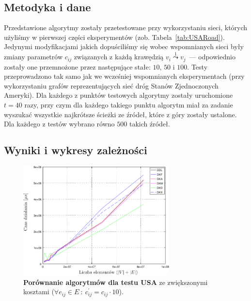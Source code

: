 \subsection{Metodyka i dane}



Przedstawione algorytmy zostały przetestowane przy wykorzystaniu sieci, których użyliśmy w pierwszej części eksperymentów (zob. Tabela~\ref{tab:USARoad}).
Jedynymi modyfikacjami jakich dopuściliśmy się wobec wspomnianych sieci były zmiany parametrów $c_{ij}$ związanych z każdą krawędzią $v_{i} \overset{1} \leadsto v_{j}$~--- odpowiednio zostały one przemnożone przez następujące stałe: $10$, $50$ i $100$.
Testy przeprowadzono tak samo jak we wcześniej wspomnianych eksperymentach (przy wykorzystaniu grafów reprezentujących sieć dróg Stanów Zjednoczonych Ameryki).
Dla każdego z punktów testowych algorytmy zostały uruchomione $t = 40$ razy, przy czym dla każdego takiego punktu algorytm miał za zadanie wyszukać wszystkie najkrótsze ścieżki ze źródeł, które z góry zostały ustalone.
Dla każdego z testów wybrano równo $500$ takich źródeł.



\subsection{Wyniki i wykresy zależności}



\begin{figure}[!htbp]
	\null\hfill
	\includegraphics[width=0.71\textwidth]{Chapter_IV/graphx1Cost_psfrag.pdf}
	\hfill\null
	\caption{
		\textbf{Porównanie algorytmów dla testu USA} ze zwiększonymi kosztami ($\forall e_{ij} \in E \: : \: c^{'}_{ij} = c_{ij} \cdot 10$).
		}
	\label{fig:plotgraphx10Cost}
\end{figure}

